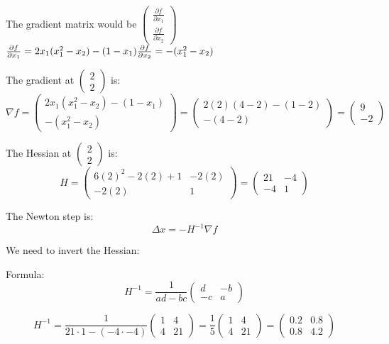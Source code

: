 \documentclass[12pt]{article}
\begin{document}
The gradient matrix would be \(\begin{pmatrix}
    \frac{\partial f} { \partial x_1} \\
    \frac{\partial f}  {\partial x_2}
\end{pmatrix}\)
\\ 
\(
    \frac{\partial f} {\partial x_1} = 2x_1(x_1^2 - x_2) - (1 - x_1) \\
    \frac{\partial f}  {\partial x_2} = -(x_1^2 - x_2)
\)

The gradient at \(\begin{pmatrix} 2 \\ 2 \end{pmatrix}\) is:
\[
\nabla f = \begin{pmatrix}
2x_1(x_1^2 - x_2) - (1 - x_1) \\
-(x_1^2 - x_2)
\end{pmatrix}
= \begin{pmatrix}
2(2)(4 - 2) - (1 - 2) \\
-(4 - 2)
\end{pmatrix}
= \begin{pmatrix}
9 \\
-2
\end{pmatrix}
\]

The Hessian at \(\begin{pmatrix} 2 \\ 2 \end{pmatrix}\) is:
\[
H = \begin{pmatrix}
6(2)^2 - 2(2) + 1 & -2(2) \\
-2(2) & 1
\end{pmatrix}
= \begin{pmatrix}
21 & -4 \\
-4 & 1
\end{pmatrix}
\]

The Newton step is:
\[
\Delta x = -H^{-1} \nabla f
\]

We need to invert the Hessian:

Formula:
\[
H^{-1} = \frac{1}{ad - bc} \begin{pmatrix}
d & -b \\
-c & a
\end{pmatrix}
\]

\[
H^{-1} = \frac{1}{21 \cdot 1 - (-4 \cdot -4)} \begin{pmatrix}
1 & 4 \\
4 & 21
\end{pmatrix}
= \frac{1}{5} \begin{pmatrix}
1 & 4 \\
4 & 21
\end{pmatrix}
= \begin{pmatrix}
0.2 & 0.8 \\
0.8 & 4.2
\end{pmatrix}
\]
\end{document}
